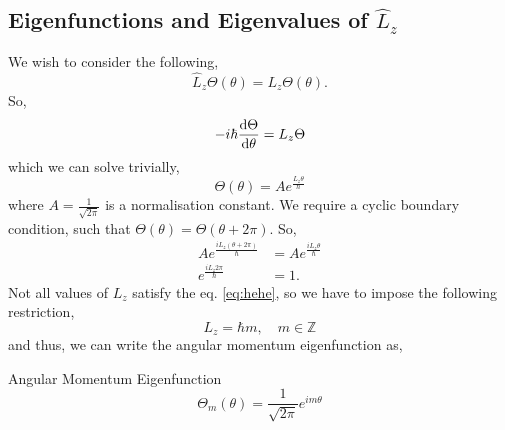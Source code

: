 \documentclass{book}
\begin{document}
\subsection{Eigenfunctions and Eigenvalues of $\hat{L}_z$}
We wish to consider the following,
\begin{equation}
	\hat{L}_z \Theta(\theta) = L_z\Theta(\theta).
\end{equation}
So,
\begin{equation}
	-i\hbar\dv{\Theta}{\theta} = L_z \Theta \label{eq:24}
\end{equation}
which we can solve trivially,
\begin{equation}
	\Theta(\theta) = Ae^{\frac{L_z\theta}{\hbar}} \label{eq:khf}
\end{equation}
where $A = \frac{1}{\sqrt{2\pi}}$ is a normalisation constant. We require a cyclic boundary condition, such that $\Theta(\theta) = \Theta(\theta + 2\pi)$. So,
\begin{equation}
	\begin{split}
	Ae^{\frac{iL_z(\theta + 2\pi)}{\hbar}} & = A e^{\frac{iL_z\theta}{\hbar}} \\
	e^{\frac{iL_z2\pi}{\hbar}} & = 1.
\end{split} \label{eq:hehe}
\end{equation}
Not all values of $L_z$ satisfy the eq. \eqref{eq:hehe}, so we have to impose the following restriction,
\begin{equation}
	L_z = \hbar m, \hspace{1em} m \in \mathbb{Z}
\end{equation}
and thus, we can write the angular momentum eigenfunction as,
\begin{Definitions}{Angular Momentum Eigenfunction}{}
	\begin{equation}
		\Theta_m(\theta) = \frac{1}{\sqrt{2\pi}} e^{im\theta}
	\end{equation}
\end{Definitions}
\end{document}
